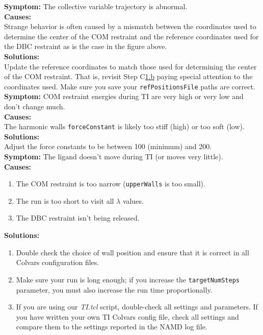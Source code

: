 \documentclass[9pt,tutorial]{Styling/livecoms}
\newcommand{\filepath}[1]{\textit{#1}}
\newcommand{\textInput}[1]{\texttt{#1}}
\begin{document}
\noindent\textbf{Symptom:} The collective variable trajectory is abnormal.\\
\textbf{Causes:}\\
Strange behavior is often caused by a mismatch between the coordinates used to determine the center of the COM restraint and the reference coordinates used for the DBC restraint as is the case in the figure above.\\
\textbf{Solutions:}\\
Update the reference coordinates to match those used for determining the center of the COM restraint. That is, revisit Step C\hyperref[step:defineGasRestraints]{1.b} paying special attention to the coordinates used. Make sure you save your \textInput{refPositionsFile} paths are correct. \\

\noindent\textbf{Symptom:} COM restraint energies during TI are very high or very low and don't change much.\\
\textbf{Causes:}\\
The harmonic walls \textInput{forceConstant} is likely too stiff (high) or too soft (low).\\
\textbf{Solutions:}\\
Adjust the force constants to be between 100 (minimum) and 200. \\

\noindent\textbf{Symptom:} The ligand doesn't move during TI (or moves very little).\\
\textbf{Causes:}
\begin{enumerate}
    \item The COM restraint is too narrow (\textInput{upperWalls} is too small).
    \item The run is too short to visit all $\lambda$ values.
    \item The DBC restraint isn't being released.
\end{enumerate}

\noindent\textbf{Solutions:}
\begin{enumerate}
    \item Double check the choice of wall position and ensure that it is correct in all Colvars configuration files.
    \item Make sure your run is long enough; if you increase the \textInput{targetNumSteps} parameter, you must also increase the run time proportionally.
    \item If you are using our \filepath{TI.tcl} script, double-check all settings and parameters. If you have written your own TI Colvars config file, check all settings and compare them to the settings reported in the NAMD log file.
\end{enumerate}
\end{document}
